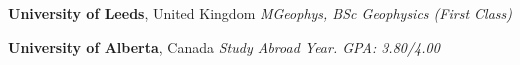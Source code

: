 %
\textbf{University of Leeds}, United Kingdom \newline
\textit{MGeophys, BSc Geophysics (First Class)} 

\medskip
\textbf{University of Alberta}, Canada \newline
\textit{Study Abroad Year. GPA\@: 3.80/4.00} 

\bigskip

